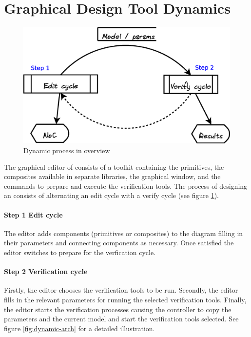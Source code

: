 

\section{Graphical Design Tool Dynamics}

\pagedepth\maxdimen

\begin{figure}
	\includegraphics[width=.95\linewidth]{../architecture-dynamic-overview}
	\caption{Dynamic process in overview}
	\label{fig:overview-dynamic}
\end{figure}

The graphical editor of \Noc consists of a toolkit containing
the \xmas primitives, the composites available in separate 
libraries, the graphical window, and the commands to 
prepare and execute the verification tools. The process of 
designing an \Noc consists of alternating an edit cycle with a verify cycle 
(see figure \ref{fig:overview-dynamic}).

\paragraph{Step 1 Edit cycle} The editor adds components (primitives or 
composites) to the \Noc diagram filling in their parameters and connecting 
components as necessary. Once satisfied the editor switches to prepare 
for the verfication cycle.

\paragraph{Step 2 Verification cycle} 
Firstly, the editor chooses the verification tools to be run.
Secondly, the editor fills in the relevant parameters for running the selected 
verification tools. Finally, the editor starts the verification processes causing
the controller to copy the parameters and the current \Noc model and start
the verification tools selected. See figure \ref{fig:dynamic-arch} for a 
detailed illustration.

